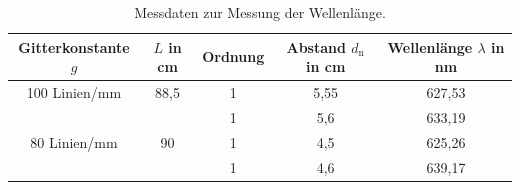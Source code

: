 \begin{table}
 \centering
 \caption{Messdaten zur Messung der Wellenlänge.}
 \label{tab:wel}
 \begin{tabular}{c c c c c}
   \toprule
   Gitterkonstante $g$ & $L$ in \si{\centi\meter}  & Ordnung & Abstand $d_\mathrm{n}$ in \si{\centi\meter} & Wellenlänge $\lambda$ in \si{\nano\meter} \\
   \midrule
   100 Linien/mm & 88,5 & 1 & 5,55  & 627,53 \\
   & & 1 & 5,6 & 633,19 \\
   80 Linien/mm & 90 & 1 & 4,5  & 625,26 \\
   & & 1 & 4,6 & 639,17\\
   \bottomrule
 \end{tabular}
\end{table}
